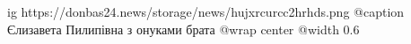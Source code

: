  
 
 
 
 

\ifcmt
  ig https://donbas24.news/storage/news/hujxrcurcc2hrhds.png
	@caption Єлизавета Пилипівна з онуками брата
  @wrap center
  @width 0.6
\fi
